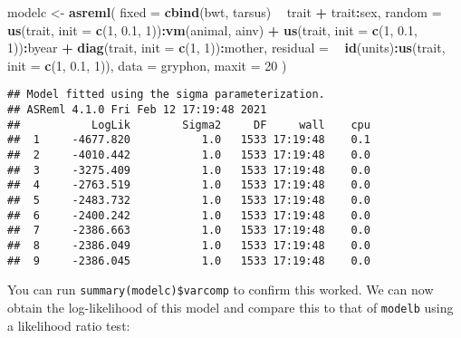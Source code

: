 \documentclass[12pt,]{book}
\newenvironment{Shaded}{\begin{snugshade}}{\end{snugshade}}
\newcommand{\DataTypeTok}[1]{\textcolor[rgb]{0.13,0.29,0.53}{#1}}
\newcommand{\DecValTok}[1]{\textcolor[rgb]{0.00,0.00,0.81}{#1}}
\newcommand{\FloatTok}[1]{\textcolor[rgb]{0.00,0.00,0.81}{#1}}
\newcommand{\KeywordTok}[1]{\textcolor[rgb]{0.13,0.29,0.53}{\textbf{#1}}}
\newcommand{\NormalTok}[1]{#1}
\newcommand{\OperatorTok}[1]{\textcolor[rgb]{0.81,0.36,0.00}{\textbf{#1}}}
\newcommand{\StringTok}[1]{\textcolor[rgb]{0.31,0.60,0.02}{#1}}
\begin{document}
\begin{Shaded}
\begin{Highlighting}[]
\NormalTok{modelc <-}\StringTok{ }\KeywordTok{asreml}\NormalTok{(}
  \DataTypeTok{fixed =} \KeywordTok{cbind}\NormalTok{(bwt, tarsus) }\OperatorTok{~}\StringTok{ }\NormalTok{trait }\OperatorTok{+}\StringTok{ }\NormalTok{trait}\OperatorTok{:}\NormalTok{sex,}
  \DataTypeTok{random =} \OperatorTok{~}\StringTok{ }\KeywordTok{us}\NormalTok{(trait, }\DataTypeTok{init =} \KeywordTok{c}\NormalTok{(}\DecValTok{1}\NormalTok{, }\FloatTok{0.1}\NormalTok{, }\DecValTok{1}\NormalTok{))}\OperatorTok{:}\KeywordTok{vm}\NormalTok{(animal, ainv) }\OperatorTok{+}
\StringTok{    }\KeywordTok{us}\NormalTok{(trait, }\DataTypeTok{init =} \KeywordTok{c}\NormalTok{(}\DecValTok{1}\NormalTok{, }\FloatTok{0.1}\NormalTok{, }\DecValTok{1}\NormalTok{))}\OperatorTok{:}\NormalTok{byear }\OperatorTok{+}
\StringTok{    }\KeywordTok{diag}\NormalTok{(trait, }\DataTypeTok{init =} \KeywordTok{c}\NormalTok{(}\DecValTok{1}\NormalTok{, }\DecValTok{1}\NormalTok{))}\OperatorTok{:}\NormalTok{mother,}
  \DataTypeTok{residual =} \OperatorTok{~}\StringTok{ }\KeywordTok{id}\NormalTok{(units)}\OperatorTok{:}\KeywordTok{us}\NormalTok{(trait, }\DataTypeTok{init =} \KeywordTok{c}\NormalTok{(}\DecValTok{1}\NormalTok{, }\FloatTok{0.1}\NormalTok{, }\DecValTok{1}\NormalTok{)),}
  \DataTypeTok{data =}\NormalTok{ gryphon,}
  \DataTypeTok{maxit =} \DecValTok{20}
\NormalTok{)}
\end{Highlighting}
\end{Shaded}

\begin{verbatim}
## Model fitted using the sigma parameterization.
## ASReml 4.1.0 Fri Feb 12 17:19:48 2021
##           LogLik        Sigma2     DF     wall    cpu
##  1     -4677.820           1.0   1533 17:19:48    0.1
##  2     -4010.442           1.0   1533 17:19:48    0.0
##  3     -3275.409           1.0   1533 17:19:48    0.0
##  4     -2763.519           1.0   1533 17:19:48    0.0
##  5     -2483.732           1.0   1533 17:19:48    0.0
##  6     -2400.242           1.0   1533 17:19:48    0.0
##  7     -2386.663           1.0   1533 17:19:48    0.0
##  8     -2386.049           1.0   1533 17:19:48    0.0
##  9     -2386.045           1.0   1533 17:19:48    0.0
\end{verbatim}

You can run \texttt{summary(modelc)\$varcomp} to confirm this worked. We can now obtain the log-likelihood of this model and compare this to that of \texttt{modelb} using a likelihood ratio test:
\end{document}
